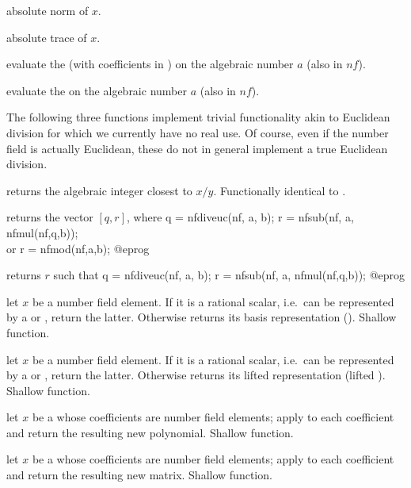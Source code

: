  absolute norm of $x$.

 absolute trace of $x$.

 evaluate the  
(with coefficients in ) on the algebraic number $a$ (also in $nf$).

 evaluate the
  on the algebraic number $a$ (also in $nf$).

The following three functions implement trivial functionality akin to
Euclidean division for which we currently have no real use. Of course, even if
the number field is actually Euclidean, these do not in general implement a
true Euclidean division.

 returns the algebraic integer
closest to $x / y$. Functionally identical to .

 returns the vector $[q,r]$, where
\bprog
  q = nfdiveuc(nf, a, b);
  r = nfsub(nf, a, nfmul(nf,q,b));    \\ or r = nfmod(nf,a,b);
@eprog

 returns $r$ such that
\bprog
  q = nfdiveuc(nf, a, b);
  r = nfsub(nf, a, nfmul(nf,q,b));
@eprog

 let $x$ be a number field
element. If it is a rational scalar, i.e.~can be represented by a 
or , return the latter. Otherwise returns its basis representation
(). Shallow function.

 let $x$ be a number field
element. If it is a rational scalar, i.e.~can be represented by a 
or , return the latter. Otherwise returns its lifted 
representation (lifted ). Shallow function.

 let $x$ be a  whose coefficients
are number field elements; apply  to each
coefficient and return the resulting new polynomial. Shallow function.

 let $x$ be a  whose coefficients
are number field elements; apply  to each
coefficient and return the resulting new matrix. Shallow function.

